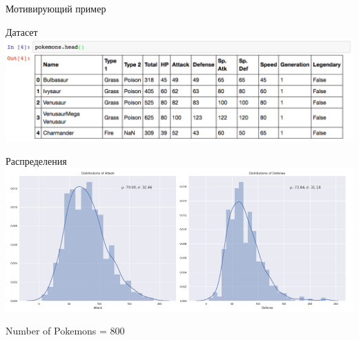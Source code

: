 \documentclass[10pt]{beamer}
\begin{document}
{\begin{frame}{Мотивирующий пример}
\begin{figure}
	    \qquad
	    \qquad
	\end{figure}
\end{frame}
}

\begin{frame}{Датасет}
    \centering
	\includegraphics[width=\textwidth]{images/pokemons}
\end{frame}

\begin{frame}{Распределения}
  \centering
	\includegraphics[width=\textwidth]{images/attack_defense}
	
	Number of Pokemons = 800
\end{frame}
\end{document}
